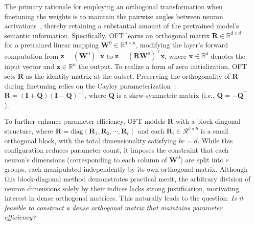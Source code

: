 The primary rationale for employing an orthogonal transformation when finetuning the weights is to maintain the pairwise angles between neuron activations~\cite{liu2018learning,liu2021orthogonal,qiu2023controlling}, thereby retaining a substantial amount of the pretrained model’s semantic information. Specifically, OFT learns an orthogonal matrix $\bm{R}\in\mathbb{R}^{d\times d}$ for a pretrained linear mapping $\bm{W}^0\in\mathbb{R}^{d\times n}$, modifying the layer's forward computation from $\bm{z}=(\bm{W}^0)^\top\bm{x}$ to $\bm{z}=(\bm{R}\bm{W}^0)^\top\bm{x}$, where $\bm{x}\in\mathbb{R}^{d}$ denotes the input vector and $\bm{z}\in\mathbb{R}^{n}$ the output. To realize a form of zero initialization, OFT sets $\bm{R}$ as the identity matrix at the outset. Preserving the orthogonality of $\bm{R}$ during finetuning relies on the Cayley parameterization~\cite{qiu2023controlling,liu2021orthogonal}: $\bm{R}=(\bm{I}+\bm{Q})(\bm{I}-\bm{Q})^{-1}$, where $\bm{Q}$ is a skew-symmetric matrix (i.e., $\bm{Q}=-\bm{Q}^\top$).

To further enhance parameter efficiency, OFT models $\bm{R}$ with a block-diagonal structure, where $\bm{R}=\text{diag}(\bm{R}_1,\bm{R}_2,\cdots,\bm{R}_r)$ and each $\bm{R}_i\in\mathcal{R}^{b\times b}$ is a small orthogonal block, with the total dimensionality satisfying $br=d$. While this configuration reduces parameter count, it imposes the constraint that each neuron's dimensions (corresponding to each column of $\bm{W}^0$) are split into $r$ groups, each manipulated independently by its own orthogonal matrix. Although this block-diagonal method demonstrates practical merit, the arbitrary division of neuron dimensions solely by their indices lacks strong justification, motivating interest in dense orthogonal matrices. This naturally leads to the question: \emph{Is it feasible to construct a dense orthogonal matrix that maintains parameter efficiency?}

